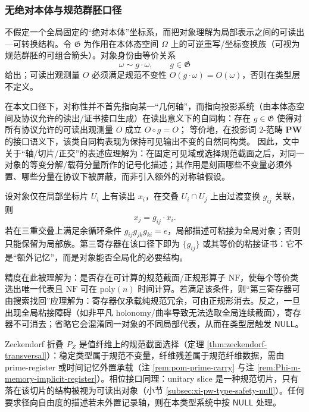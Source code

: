 \subsubsection{无绝对本体与规范群胚口径}\label{subsec:pom-gauge-groupoid}
不假定一个全局固定的“绝对本体”坐标系，而把对象理解为局部表示之间的可读出—可转换结构。令 \(\mathfrak{G}\) 为作用在本体态空间 \(\Omega\) 上的可逆重写/坐标变换族（可视为规范群胚的可组合箭头）。对象身份由等价关系
\[
\omega\sim g\cdot\omega,\qquad g\in\mathfrak{G}
\]
给出；可读出观测量 \(O\) 必须满足规范不变性 \(O(g\cdot\omega)=O(\omega)\)，否则在类型层不定义。

\begin{remark}\label{rem:symmetry-projection-automorphism}
在本文口径下，对称性并不首先指向某一“几何轴”，而指向投影系统（由本体态空间及协议允许的读出/证书接口生成）在读出意义下的自同构：存在 \(g\in\mathfrak{G}\) 使得对所有协议允许的可读出观测量 \(O\) 成立 \(O\circ g=O\)；
等价地，在投影词 \(2\)-范畴 \(\mathbf{PW}\) 的接口语义下，该类自同构表现为保持可见输出不变的自然同构类。
因此，文中关于“轴/切片/正交”的表述应理解为：在固定可见域或选择规范截面之后，对同一对象的等变分解/载荷分量所作的记号化描述；其作用是刻画哪些不变量必须外置、哪些分量在协议下被屏蔽，而非引入额外的对称轴假设。
\end{remark}

\begin{remark}[粘接数据与第三寄存器]\label{rem:pom-gauge-third-register}
设对象仅在局部坐标片 \(U_i\) 上有读出 \(x_i\)，在交叠 \(U_i\cap U_j\) 上由过渡变换 \(g_{ij}\) 关联，则
\[
x_j=g_{ij}\cdot x_i.
\]
若在三重交叠上满足余循环条件 \(g_{ij}g_{jk}g_{ki}=e\)，局部描述可粘接为全局对象；否则只能保留为局部族。第三寄存器在该口径下即为 \(\{g_{ij}\}\) 或其等价的粘接证书：它不是“额外记忆”，而是对象能否全局化的必要结构。
\end{remark}

\begin{remark}\label{rem:pom-gauge-normal-form}
精度在此被理解为：是否存在可计算的规范截面/正规形算子 \(\mathrm{NF}\)，使每个等价类选出唯一代表且 \(\mathrm{NF}\) 可在 \(\mathrm{poly}(n)\) 时间计算。若满足该条件，则“第三寄存器可由搜索找回”应理解为：寄存器仅承载纯规范冗余，可由正规形消去。反之，一旦出现全局粘接障碍（如非平凡 holonomy/曲率导致无法选取全局连续截面），寄存器不可消去；省略它会混淆同一对象的不同局部代表，从而在类型层触发 \(\mathsf{NULL}\)。
\end{remark}

\begin{remark}\label{rem:pom-gauge-zeck-phase-null}
Zeckendorf 折叠 \(P_Z\) 是值纤维上的规范截面选择（定理 \ref{thm:zeckendorf-transversal}）：稳定类型属于规范不变量，纤维残差属于规范纤维数据，需由 prime-register 或时间记忆外置承载（注 \ref{rem:pom-prime-carry} 与注 \ref{rem:Phi-m-memory-implicit-register}）。相位接口同理：unitary slice 是一种规范切片，只有落在该切片的结构被视为可读出对象（小节 \ref{subsec:xi-pw-type-safety-null}）。任何要求径向自由度的描述若未外置记录轴，则在本类型系统中按 \(\mathsf{NULL}\) 处理。
\end{remark}


